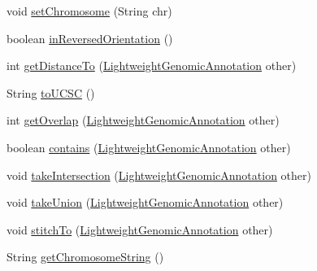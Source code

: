 \begin{DoxyCompactItemize}
\item 
void \hyperlink{interfacebroad_1_1core_1_1annotation_1_1_lightweight_genomic_annotation_ade7adfb7a7597f976d547736ce83a48d}{set\+Chromosome} (String chr)
\item 
boolean \hyperlink{interfacebroad_1_1core_1_1annotation_1_1_lightweight_genomic_annotation_aacaec867ef129abbfb9e96d2dfb5630f}{in\+Reversed\+Orientation} ()
\item 
int \hyperlink{interfacebroad_1_1core_1_1annotation_1_1_lightweight_genomic_annotation_a7b51d8f731634b924bd1fd8507acf416}{get\+Distance\+To} (\hyperlink{interfacebroad_1_1core_1_1annotation_1_1_lightweight_genomic_annotation}{Lightweight\+Genomic\+Annotation} other)
\item 
String \hyperlink{interfacebroad_1_1core_1_1annotation_1_1_lightweight_genomic_annotation_a3dd25602f0a402d70a9082bb43e479b8}{to\+U\+C\+S\+C} ()
\item 
int \hyperlink{interfacebroad_1_1core_1_1annotation_1_1_lightweight_genomic_annotation_a0a033cc9a97af87142b83afa0317668c}{get\+Overlap} (\hyperlink{interfacebroad_1_1core_1_1annotation_1_1_lightweight_genomic_annotation}{Lightweight\+Genomic\+Annotation} other)
\item 
boolean \hyperlink{interfacebroad_1_1core_1_1annotation_1_1_lightweight_genomic_annotation_a2987707b47ff3712738f13421c153f1f}{contains} (\hyperlink{interfacebroad_1_1core_1_1annotation_1_1_lightweight_genomic_annotation}{Lightweight\+Genomic\+Annotation} other)
\item 
void \hyperlink{interfacebroad_1_1core_1_1annotation_1_1_lightweight_genomic_annotation_a715faaebac5a1b2fc77e288f78a497e0}{take\+Intersection} (\hyperlink{interfacebroad_1_1core_1_1annotation_1_1_lightweight_genomic_annotation}{Lightweight\+Genomic\+Annotation} other)
\item 
void \hyperlink{interfacebroad_1_1core_1_1annotation_1_1_lightweight_genomic_annotation_a60f452f5cd3a0a29b2dec762fd61d763}{take\+Union} (\hyperlink{interfacebroad_1_1core_1_1annotation_1_1_lightweight_genomic_annotation}{Lightweight\+Genomic\+Annotation} other)
\item 
void \hyperlink{interfacebroad_1_1core_1_1annotation_1_1_lightweight_genomic_annotation_a5649ce7db12f7377ae3a858884fca5af}{stitch\+To} (\hyperlink{interfacebroad_1_1core_1_1annotation_1_1_lightweight_genomic_annotation}{Lightweight\+Genomic\+Annotation} other)
\item 
String \hyperlink{interfacebroad_1_1core_1_1annotation_1_1_lightweight_genomic_annotation_a5ab11d683bcfed2572c3914ee5ba5a24}{get\+Chromosome\+String} ()

\end{DoxyCompactItemize}
